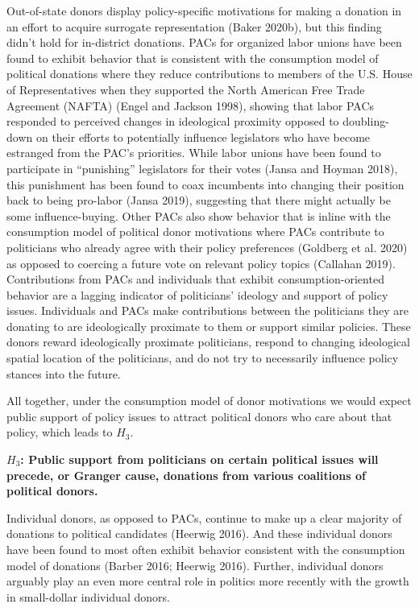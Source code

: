 \documentclass[12pt,]{article}
\begin{document}
Out-of-state donors display policy-specific motivations for making a
donation in an effort to acquire surrogate representation (Baker 2020b),
but this finding didn't hold for in-district donations. PACs for
organized labor unions have been found to exhibit behavior that is
consistent with the consumption model of political donations where they
reduce contributions to members of the U.S. House of Representatives
when they supported the North American Free Trade Agreement (NAFTA)
(Engel and Jackson 1998), showing that labor PACs responded to perceived
changes in ideological proximity opposed to doubling-down on their
efforts to potentially influence legislators who have become estranged
from the PAC's priorities. While labor unions have been found to
participate in ``punishing'' legislators for their votes (Jansa and
Hoyman 2018), this punishment has been found to coax incumbents into
changing their position back to being pro-labor (Jansa 2019), suggesting
that there might actually be some influence-buying. Other PACs also show
behavior that is inline with the consumption model of political donor
motivations where PACs contribute to politicians who already agree with
their policy preferences (Goldberg et al. 2020) as opposed to coercing a
future vote on relevant policy topics (Callahan 2019). Contributions
from PACs and individuals that exhibit consumption-oriented behavior are
a lagging indicator of politicians' ideology and support of policy
issues. Individuals and PACs make contributions between the politicians
they are donating to are ideologically proximate to them or support
similar policies. These donors reward ideologically proximate
politicians, respond to changing ideological spatial location of the
politicians, and do not try to necessarily influence policy stances into
the future.

All together, under the consumption model of donor motivations we would
expect public support of policy issues to attract political donors who
care about that policy, which leads to \(H_{3}\).

\textbf{\(H_{3}\): Public support from politicians on certain political
issues will precede, or Granger cause, donations from various coalitions
of political donors.}

Individual donors, as opposed to PACs, continue to make up a clear
majority of donations to political candidates (Heerwig 2016). And these
individual donors have been found to most often exhibit behavior
consistent with the consumption model of donations (Barber 2016; Heerwig
2016). Further, individual donors arguably play an even more central
role in politics more recently with the growth in small-dollar
individual donors.
\end{document}
